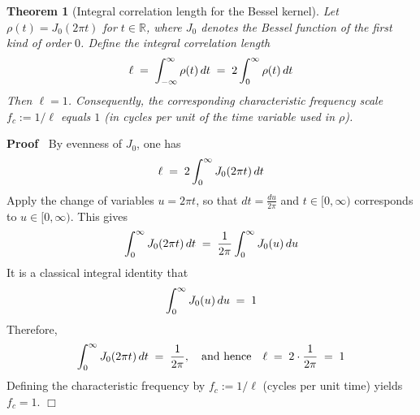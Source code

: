 \documentclass{article}
\newcommand{\assign}{:=}
\newenvironment{proof}{\noindent\textbf{Proof\ }}{\hspace*{\fill}$\Box$\medskip}
\newtheorem{theorem}{Theorem}
\begin{document}
\

\

\begin{theorem}
  [Integral correlation length for the Bessel kernel] Let $\rho (t) = J_0  (2
  \pi t)$ for $t \in \mathbb{R}$, where $J_0$ denotes the Bessel function of
  the first kind of order $0$. Define the integral correlation length
  \begin{equation}
    \ell \hspace{0.27em} = \hspace{0.27em} \int_{- \infty}^{\infty} \rho (t) 
    \hspace{0.17em} dt \hspace{0.27em} = \hspace{0.27em} 2 \int_0^{\infty}
    \rho (t)  \hspace{0.17em} dt
  \end{equation}
  Then $\ell = 1$. Consequently, the corresponding characteristic frequency
  scale $f_c \assign 1 / \ell$ equals $1$ (in cycles per unit of the time
  variable used in $\rho$).
\end{theorem}

\begin{proof}
  By evenness of $J_0$, one has
  \begin{equation}
    \ell \hspace{0.27em} = \hspace{0.27em} 2 \int_0^{\infty} J_0  (2 \pi t) 
    \hspace{0.17em} dt
  \end{equation}
  Apply the change of variables $u = 2 \pi t$, so that $dt = \frac{du}{2 \pi}$
  and $t \in [0, \infty)$ corresponds to $u \in [0, \infty)$. This gives
  \begin{equation}
    \int_0^{\infty} J_0  (2 \pi t)  \hspace{0.17em} dt \hspace{0.27em} =
    \hspace{0.27em} \frac{1}{2 \pi}  \int_0^{\infty} J_0 (u)  \hspace{0.17em}
    du
  \end{equation}
  It is a classical integral identity that
  \begin{equation}
    \int_0^{\infty} J_0 (u)  \hspace{0.17em} du \hspace{0.27em} =
    \hspace{0.27em} 1
  \end{equation}
  Therefore,
  \begin{equation}
    \int_0^{\infty} J_0  (2 \pi t)  \hspace{0.17em} dt \hspace{0.27em} =
    \hspace{0.27em} \frac{1}{2 \pi}, \quad \text{and hence} \quad \ell
    \hspace{0.27em} = \hspace{0.27em} 2 \cdot \frac{1}{2 \pi} \hspace{0.27em}
    = \hspace{0.27em} 1
  \end{equation}
  Defining the characteristic frequency by $f_c \assign 1 / \ell$ (cycles per
  unit time) yields $f_c = 1$.
\end{proof}
\end{document}
